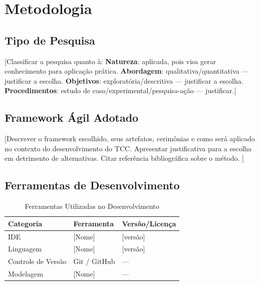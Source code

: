 \section{Metodologia}
\label{sec:metodologia}

\subsection{Tipo de Pesquisa}
\label{sec:tipo-pesquisa}

[Classificar a pesquisa quanto à:
\textbf{Natureza}: aplicada, pois visa gerar conhecimento para aplicação prática.
\textbf{Abordagem}: qualitativa/quantitativa --- justificar a escolha.
\textbf{Objetivos}: exploratória/descritiva --- justificar a escolha.
\textbf{Procedimentos}: estudo de caso/experimental/pesquisa-ação --- justificar.]

\subsection{Framework Ágil Adotado}
\label{sec:framework}

[Descrever o framework escolhido, seus artefatos, cerimônias e como será aplicado
no contexto do desenvolvimento do TCC.
Apresentar justificativa para a escolha em detrimento de alternativas.
Citar referência bibliográfica sobre o método. \cite{metodo}]

\subsection{Ferramentas de Desenvolvimento}
\label{sec:ferramentas}

\begin{table}[h]
\caption{Ferramentas Utilizadas no Desenvolvimento}
\label{tab:ferramentas}
\centering
\begin{tabular}{lll}
\toprule
\textbf{Categoria}     & \textbf{Ferramenta} & \textbf{Versão/Licença} \\
\midrule
IDE                    & [Nome]              & [versão]                \\
Linguagem              & [Nome]              & [versão]                \\
Controle de Versão     & Git / GitHub        & ---                     \\
Modelagem              & [Nome]              & ---                     \\
\bottomrule
\end{tabular}
\end{table}
